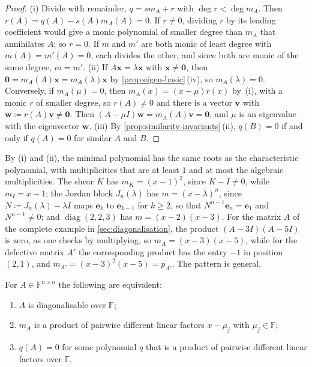 \begin{proof}
(i) Divide with remainder, $q=sm_A+r$ with $\deg r<\deg m_A$. Then $r(A)=q(A)-s(A)m_A(A)=0$. If $r\ne0$, dividing $r$ by its leading coefficient would give a monic polynomial of smaller degree than $m_A$ that annihilates $A$; so $r=0$. If $m$ and $m'$ are both monic of least degree with $m(A)=m'(A)=0$, each divides the other, and since both are monic of the same degree, $m=m'$. (ii) If $A\mathbf x=\lambda\mathbf x$ with $\mathbf x\ne\mathbf 0$, then $\mathbf 0=m_A(A)\mathbf x=m_A(\lambda)\mathbf x$ by \cref{prop:eigen-basic}\,(iv), so $m_A(\lambda)=0$. Conversely, if $m_A(\mu)=0$, then $m_A(x)=(x-\mu)r(x)$ by \,(i), with a monic $r$ of smaller degree, so $r(A)\ne0$ and there is a vector $\mathbf v$ with $\mathbf w\coloneqq r(A)\mathbf v\ne\mathbf 0$. Then $(A-\mu I)\mathbf w=m_A(A)\mathbf v=\mathbf 0$, and $\mu$ is an eigenvalue with the eigenvector $\mathbf w$. (iii) By \cref{prop:similarity-invariants}\,(ii), $q(B)=0$ if and only if $q(A)=0$ for similar $A$ and $B$.
\end{proof}

By (i) and (ii), the minimal polynomial has the same roots as the characteristic polynomial, with multiplicities that are at least $1$ and at most the algebraic multiplicities. The shear $K$ has $m_K=(x-1)^2$, since $K-I\ne0$, while $m_I=x-1$; the Jordan block $J_n(\lambda)$ has $m=(x-\lambda)^n$, since $N\coloneqq J_n(\lambda)-\lambda I$ maps $\mathbf e_k$ to $\mathbf e_{k-1}$ for $k\ge2$, so that $N^{n-1}\mathbf e_n=\mathbf e_1$ and $N^{n-1}\ne0$; and $\operatorname{diag}(2,2,3)$ has $m=(x-2)(x-3)$. For the matrix $A$ of the complete example in \cref{sec:diagonalisation}, the product $(A-3I)(A-5I)$ is zero, as one checks by multiplying, so $m_A=(x-3)(x-5)$, while for the defective matrix $A'$ the corresponding product has the entry $-1$ in position $(2,1)$, and $m_{A'}=(x-3)^2(x-5)=p_{A'}$. The pattern is general.

\begin{theorem}
\label{thm:diagonalisable-minimal}
For $A\in\mathbb F^{n\times n}$ the following are equivalent:
\begin{enumerate}
\item $A$ is diagonalisable over $\mathbb F$;
\item $m_A$ is a product of pairwise different linear factors $x-\mu_j$ with $\mu_j\in\mathbb F$;
\item $q(A)=0$ for some polynomial $q$ that is a product of pairwise different linear factors over $\mathbb F$.
\end{enumerate}
\end{theorem}

